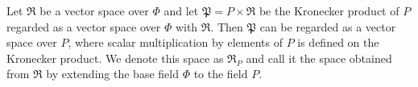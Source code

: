 Let $\mathfrak{R}$ be a vector space over $\Phi$ and let $\mathfrak{P} = P \times \mathfrak{R}$ be the Kronecker product of $P$ regarded as a vector space over $\Phi$ with $\mathfrak{R}$. Then $\mathfrak{P}$ can be regarded as a vector space over $P$, where scalar multiplication by elements of $P$ is defined on the Kronecker product. We denote this space as $\mathfrak{R}_P$ and call it the space obtained from $\mathfrak{R}$ by extending the base field $\Phi$ to the field $P$.
